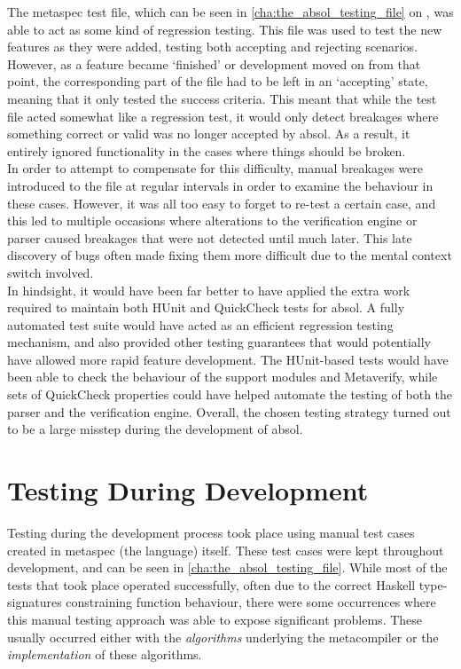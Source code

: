 The \gls{metaspec} test file, which can be seen in \autoref{cha:the_absol_testing_file} on , was able to act as some kind of regression testing.
This file was used to test the new features as they were added, testing both accepting and rejecting scenarios.
However, as a feature became `finished' or development moved on from that point, the corresponding part of the file had to be left in an `accepting' state, meaning that it only tested the success criteria.
This meant that while the test file acted somewhat like a regression test, it would only detect breakages where something correct or valid was no longer accepted by \gls{absol}.
As a result, it entirely ignored functionality in the cases where things should be broken.\\

In order to attempt to compensate for this difficulty, manual breakages were introduced to the file at regular intervals in order to examine the behaviour in these cases. 
However, it was all too easy to forget to re-test a certain case, and this led to multiple occasions where alterations to the verification engine or parser caused breakages that were not detected until much later.
This late discovery of bugs often made fixing them more difficult due to the mental context switch involved. \\

In hindsight, it would have been far better to have applied the extra work required to maintain both HUnit and QuickCheck tests for \gls{absol}.
A fully automated test suite would have acted as an efficient regression testing mechanism, and also provided other testing guarantees that would potentially have allowed more rapid feature development. 
The HUnit-based tests would have been able to check the behaviour of the support modules and Metaverify, while sets of QuickCheck properties could have helped automate the testing of both the parser and the verification engine.
Overall, the chosen testing strategy turned out to be a large misstep during the development of \gls{absol}.



\section{Testing During Development} %
\label{sec:testing_during_development}
Testing during the development process took place using manual test cases created in \gls{metaspec} (the language) itself.
These test cases were kept throughout development, and can be seen in \autoref{cha:the_absol_testing_file}.
While most of the tests that took place operated successfully, often due to the correct Haskell type-signatures constraining function behaviour, there were some occurrences where this manual testing approach was able to expose significant problems.
These usually occurred either with the \textit{algorithms} underlying the metacompiler or the \textit{implementation} of these algorithms.

